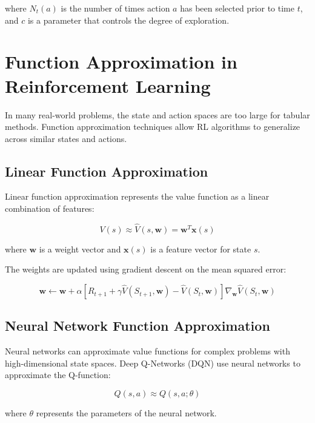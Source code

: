 \documentclass{article}
\begin{document}
where $N_t(a)$ is the number of times action $a$ has been selected prior to time $t$, and $c$ is a parameter that controls the degree of exploration.

\section{Function Approximation in Reinforcement Learning}

In many real-world problems, the state and action spaces are too large for tabular methods. Function approximation techniques allow RL algorithms to generalize across similar states and actions.

\subsection{Linear Function Approximation}

Linear function approximation represents the value function as a linear combination of features:

\begin{equation}
V(s) \approx \hat{V}(s, \mathbf{w}) = \mathbf{w}^T \mathbf{x}(s)
\end{equation}

where $\mathbf{w}$ is a weight vector and $\mathbf{x}(s)$ is a feature vector for state $s$.

The weights are updated using gradient descent on the mean squared error:

\begin{equation}
\mathbf{w} \leftarrow \mathbf{w} + \alpha [R_{t+1} + \gamma \hat{V}(S_{t+1}, \mathbf{w}) - \hat{V}(S_t, \mathbf{w})] \nabla_\mathbf{w} \hat{V}(S_t, \mathbf{w})
\end{equation}

\subsection{Neural Network Function Approximation}

Neural networks can approximate value functions for complex problems with high-dimensional state spaces. Deep Q-Networks (DQN) use neural networks to approximate the Q-function:

\begin{equation}
Q(s, a) \approx Q(s, a; \theta)
\end{equation}

where $\theta$ represents the parameters of the neural network.
\end{document}
